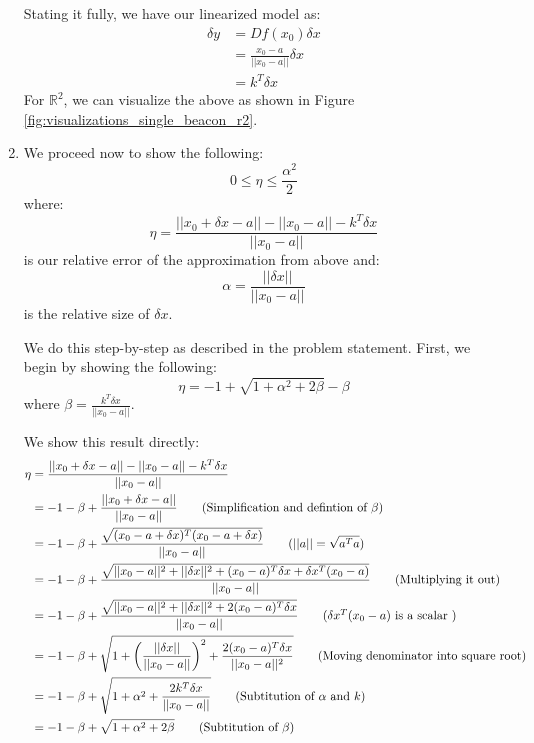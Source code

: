 \documentclass[12pt]{exam}
\begin{document}
\begin{questions}
\begin{solution}
\begin{enumerate}[label=(\alph*)]
      Stating it fully, we have our linearized model as:
      \begin{align*}
        \delta y &= Df(x_0) \delta x \\
        &= \frac{x_0 - a}{||x_0 - a||} \delta x \tag{Shown above} \\
        &= k^T\delta x \tag{Where $k$ is a unit vector pointing from $a$ to $x_0$}
      \end{align*}
      For $\mathbb{R}^2$, we can visualize the above as shown in Figure \ref{fig:visualizations_single_beacon_r2}.
    \item We proceed now to show the following:
    \[
      0 \leq \eta \leq \frac{\alpha^2}{2}
    \]
    where:
    \[
      \eta = \frac{||x_0 + \delta x - a|| - ||x_0 - a|| - k^T \delta x}{||x_0 - a||}
    \]
    is our relative error of the approximation from above
    and:
    \[
      \alpha = \frac{||\delta x||}{|| x_0 - a||}
    \]
    is the relative size of $\delta x$.

    We do this step-by-step as described in the problem statement. First, we begin by showing the following:
    \[
      \eta = -1 + \sqrt{1 + \alpha^2 + 2\beta} - \beta
    \]
    where $\beta = \frac{ k^T \delta x }{|| x_0 - a||}$.

    We show this result directly:
    \begin{align*}
      \eta &= \frac{||x_0 + \delta x - a|| - ||x_0 - a|| - k^T \delta x}{||x_0 - a||} \\
      &= -1 - \beta + \frac{||x_0 + \delta x - a ||}{||x_0 - a ||} \tag{Simplification and defintion of $\beta$} \\
      &= -1 - \beta + \frac{\sqrt{(x_0 - a + \delta x)^T(x_0 - a + \delta x)}}{|| x_0 - a|| } \tag{$||a|| = \sqrt{a^T a}$} \\
      &= -1 - \beta + \frac{\sqrt{ ||x_0 - a||^2 + ||\delta x ||^2 + (x_0 - a)^T\delta x + \delta x^T (x_0 - a)  }}{||x_0 - a||} \tag{Multiplying it out} \\
      &= -1 - \beta + \frac{\sqrt{ ||x_0 - a||^2 + ||\delta x ||^2 + 2(x_0 - a)^T\delta x }}{||x_0 - a||} \tag{$\delta x^T (x_0 - a)$ is a scalar } \\ 
      &= -1 - \beta + \sqrt{ 1 + \left(\frac{||\delta x ||}{|| x_0 - a ||}\right)^2 + \frac{2(x_0 - a)^T\delta x}{||x_0 -a||^2} } \tag{Moving denominator into square root}\\
      &=-1 - \beta + \sqrt{ 1 + \alpha^2 + \frac{2k^T\delta x}{||x_0 - a||} } \tag{Subtitution of $\alpha$ and $k$} \\
      &= -1 - \beta + \sqrt{1 + \alpha^2 + 2\beta} \tag{Subtitution of $\beta$}
    \end{align*}


\end{enumerate}
\end{solution}
\end{questions}
\end{document}
